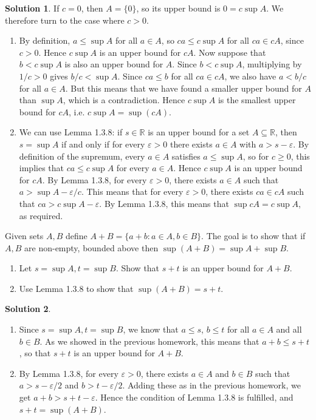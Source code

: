 \documentclass[12pt]{article}
\theoremstyle{definition}
\theoremstyle{definition}
\newtheorem*{soln}{Solution}
\newcommand{\R}{\mathbb{R}}
\begin{document}
\begin{soln}
If $c=0$, then $A=\{0\}$, so its upper bound is $0=c\sup A$. We therefore turn to the case where $c>0$.
\begin{enumerate}[label=\textbf{Method \arabic*.}]
\item By definition, $a\leq \sup A$ for all $a\in A$, so $ca\leq c\sup A$ for all $ca\in cA$, since $c>0$. Hence $c\sup A$ is an upper bound for $cA$. Now suppose that $b<c\sup A$ is also an upper bound for $A$. Since $b<c\sup A$, multiplying by $1/c>0$ gives $b/c<\sup A$. Since $ca\leq b$ for all $ca\in cA$, we also have $a<b/c$ for all $a\in A$. But this means that we have found a smaller upper bound for $A$ than $\sup A$, which is a contradiction. Hence $c\sup A$ is the smallest upper bound for $cA$, i.e. $c\sup A=\sup(cA)$.

\item We can use Lemma 1.3.8: if $s\in\R$ is an upper bound for a set $A\subseteq\R$, then $s=\sup A$ if and only if for every $\varepsilon>0$ there exists $a\in A$ with $a>s-\varepsilon$. By definition of the supremum, every $a\in A$ satisfies $a\leq \sup A$, so for $c\geq 0$, this implies that $ca\leq c\sup A$ for every $a\in A$. Hence $c\sup A$ is an upper bound for $cA$. By Lemma 1.3.8, for every $\varepsilon>0$, there exists $a\in A$ such that $a>\sup A-\varepsilon/c$. This means that for every $\varepsilon>0$, there exists $ca\in cA$ such that $ca>c\sup A-\varepsilon$. By Lemma 1.3.8, this means that $\sup cA=c\sup A$, as required.
\end{enumerate}
\end{soln}

\break

\begin{prob}
Given sets $A,B$ define $A+B=\{a+b:a\in A,b\in B\}$. The goal is to show that if $A,B$ are non-empty, bounded above then $\sup(A+B)=\sup A+\sup B$.
\begin{enumerate}[label=\arabic*.]
\item Let $s=\sup A,t= \sup B$. Show that $s+t$ is an upper bound for $A+B$.

\item Use Lemma 1.3.8 to show that $\sup(A+B)=s+t$.
\end{enumerate}
\end{prob}

\begin{soln}
\begin{enumerate}[label=\arabic*.]
\item Since $s=\sup A,t=\sup B$, we know that $a\leq s$, $b\leq t$ for all $a\in A$ and all $b\in B$. As we showed in the previous homework, this means that $a+b\leq s+t$, so that $s+t$ is an upper bound for $A+B$.

\item By Lemma 1.3.8, for every $\varepsilon>0$, there exists $a\in A$ and $b\in B$ such that $a>s-\varepsilon/2$ and $b>t-\varepsilon/2$. Adding these as in the previous homework, we get 
$a+b>s+t-\varepsilon$. Hence the condition of Lemma 1.3.8 is fulfilled, and $s+t=\sup(A+B)$.
\end{enumerate}
\end{soln}
\end{document}
